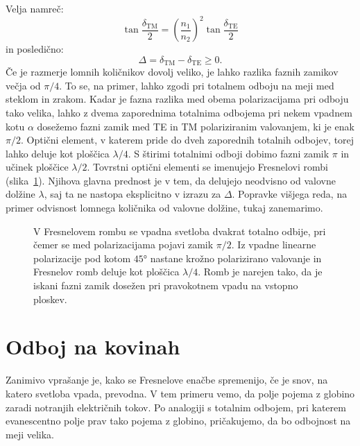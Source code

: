 Velja namreč:
\begin{equation}
\tan \frac{\delta_\mathrm{TM}}{2} = \left(\frac{n_1}{n_2}\right)^2 \tan \frac{\delta_\mathrm{TE}}{2}
\label{eq:04_87}
\end{equation}
in posledično:
\begin{equation}
\Delta = \delta_\mathrm{TM}-\delta_\mathrm{TE} \ge 0.
\label{eq:04_88}
\end{equation}
Če je razmerje lomnih količnikov dovolj veliko, je lahko  razlika faznih zamikov 
večja od $\pi/4$. To se, na primer, lahko zgodi pri totalnem odboju na meji med steklom in zrakom. 
Kadar je fazna razlika med obema polarizacijama pri odboju tako velika, lahko  z dvema zaporednima
totalnima odbojema pri nekem vpadnem kotu $\alpha$
dosežemo fazni zamik med TE in TM polariziranim valovanjem, ki je enak $\pi/2$. 
Optični element, v katerem pride do dveh zaporednih totalnih odbojev, torej lahko deluje kot ploščica
$\lambda/4$.
S štirimi totalnimi odboji dobimo fazni zamik $\pi$ in učinek ploščice 
$\lambda/2$. 
Tovrstni optični elementi se imenujejo Fresnelovi rombi 
(slika~\ref{fig:04_Fresneltot}). 
Njihova glavna prednost je v tem, da delujejo neodvisno od 
valovne dolžine $\lambda$, saj ta ne nastopa eksplicitno v izrazu za $\Delta$. Popravke 
višjega reda, na primer odvisnost lomnega količnika od valovne dolžine, tukaj zanemarimo.
\begin{figure}[ht]
\centering
\def\svgwidth{70truemm} 

\caption{V Fresnelovem rombu se vpadna svetloba dvakrat totalno odbije, pri čemer
se med polarizacijama pojavi zamik $\pi/2$. Iz vpadne linearne polarizacije pod kotom 
$45\si{\degree}$ nastane krožno polarizirano valovanje in Fresnelov romb deluje 
kot ploščica $\lambda/4$. Romb je narejen tako, da je iskani fazni 
zamik dosežen pri pravokotnem vpadu na vstopno ploskev.}
\label{fig:04_Fresneltot}
\end{figure}

\section{Odboj na kovinah}
\label{section:410}
Zanimivo vprašanje je, kako se Fresnelove enačbe spremenijo, če je snov, 
na katero svetloba vpada, prevodna. V tem primeru
vemo, da polje pojema z globino zaradi notranjih električnih tokov. 
Po analogiji s totalnim odbojem, pri katerem evanescentno polje prav tako
pojema z globino, pričakujemo, da bo odbojnost na meji velika. 


